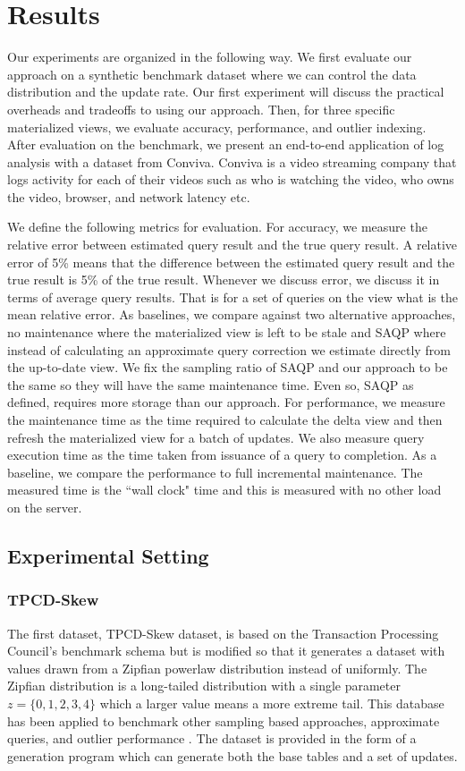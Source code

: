 \section{Results}
\label{exp}
Our experiments are organized in the following way.
We first evaluate our approach on a synthetic benchmark dataset where we can control the data distribution and the update rate.
Our first experiment will discuss the practical overheads and tradeoffs to using our approach.
Then, for three specific materialized views, we evaluate accuracy, performance, and outlier indexing.
After evaluation on the benchmark, we present an end-to-end application of log analysis with a dataset from Conviva.
Conviva is a video streaming company that logs activity for each of their videos such as who is watching the video, who owns the video, browser, and network latency etc. 

We define the following metrics for evaluation.
For accuracy, we measure the relative error between estimated query result and the true query result.
A relative error of 5\% means that the difference between the estimated query result and the true result is 5\% of the true result.
Whenever we discuss error, we discuss it in terms of average query results. 
That is for a set of queries on the view what is the mean relative error. 
As baselines, we compare against two alternative approaches, no maintenance where the materialized view is left to be stale and SAQP where instead 
of calculating an approximate query correction we estimate directly from the up-to-date view.
We fix the sampling ratio of SAQP and our approach to be the same so they will have the same maintenance time.
Even so, SAQP as defined, requires more storage than our approach.
For performance, we measure the maintenance time as the time required to calculate the delta view and then refresh the materialized view for a batch of updates.
We also measure query execution time as the time taken from issuance of a query to completion.
As a baseline, we compare the performance to full incremental maintenance.
The measured time is the ``wall clock" time and this is measured with no other load on the server.

\subsection{Experimental Setting}
\subsubsection{TPCD-Skew}
The first dataset, TPCD-Skew dataset, is based on the Transaction Processing Council's benchmark
schema but is modified so that it generates a dataset with values drawn from a Zipfian powerlaw distribution instead of uniformly.
The Zipfian distribution \cite{mitzenmacher2004brief} is a long-tailed distribution with a single parameter $z=\{0,1,2,3,4\}$ which a larger
value means a more extreme tail.
This database has been applied to benchmark other sampling based approaches, approximate queries, and outlier performance \cite{chaudhuri2001overcoming, agrawal2005database}.
The dataset is provided in the form of a generation program which can generate both the base tables and a set of updates.

